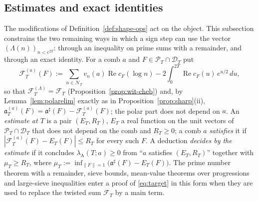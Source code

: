 \documentclass[11pt]{amsart}
\theoremstyle{definition}
\theoremstyle{remark}
\newcommand{\Rel}{\operatorname{Re}}
\newcommand{\PT}{\mathcal P_T}
\newcommand{\cF}{c_F}
\newcommand{\NT}{\mathcal N_T}
\begin{document}
\subsection{Estimates and exact identities}\label{subsec:shape-est}

The modifications of Definition~\ref{def:shape-ops} act on the object. This subsection constrains the two remaining ways in which a sign
step can use the vector $(\Lambda(n))_{n<e^{2T}}$: through an inequality on prime sums with a remainder, and through an exact identity.
For a comb $a$ and $F\in\PT\cap\mathcal D_T$ put
\[
\mathcal F^{(a)}_T(F):=\sum_{n\in\NT}v_n(a)\Rel\cF(\log n)-2\int_0^{2T}\Rel\cF(u)\,e^{u/2}\,du ,
\]
so that $\mathcal F^{(\Lambda)}_T=\mathcal F_T$ (Proposition~\ref{prop:wit-cheb}) and, by Lemma~\ref{lem:polarelim} exactly as in
Proposition~\ref{prop:sharp}(ii), $\mathfrak a^{(a)}_T(F)=\mathfrak a^\sharp(F)-\mathcal F^{(a)}_T(F)$; the polar part does not depend on $a$.
An \emph{estimate at $T$} is a pair $(E_T,R_T)$, $E_T$ a real function on the unit vectors of $\PT\cap\mathcal D_T$ that does not depend
on the comb and $R_T\ge0$; a comb $a$ \emph{satisfies} it if $|\mathcal F^{(a)}_T(F)-E_T(F)|\le R_T$ for every such $F$. A deduction
\emph{decides by the estimate} if it concludes $\lambda_{\mathrm A}(T;a)\ge0$ from ``$a$ satisfies $(E_T,R_T)$'' together with
$\mu_T\ge R_T$, where $\mu_T:=\inf_{\|F\|=1}\big(\mathfrak a^\sharp(F)-E_T(F)\big)$. The prime number theorem with a remainder, sieve
bounds, mean-value theorems over progressions and large-sieve inequalities enter a proof of \eqref{eq:target} in this form when they
are used to replace the twisted sum $\mathcal F_T$ by a main term.
\end{document}
